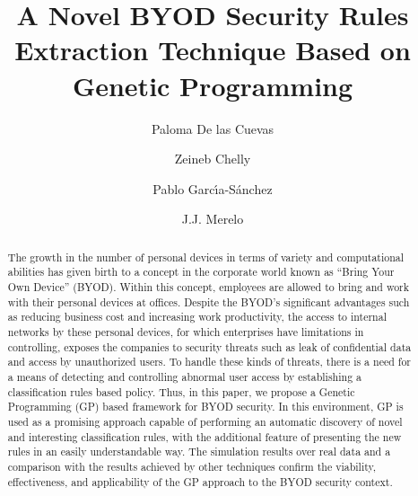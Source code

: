 \documentclass[a4paper,10pt,twocolumn,preprint,3p]{elsarticle}
\begin{document}
\begin{frontmatter}

\title{A Novel BYOD Security Rules Extraction Technique Based on Genetic Programming}

\author[ugr]{Paloma De las Cuevas}
\author[isgt]{Zeineb Chelly}
\author[ugr]{Pablo Garc\'{\i}a-S\'anchez}
\author[ugr]{J.J. Merelo}

\address[ugr]{Department of Computer Architecture and Computer Technology, ETSIIT and CITIC \\
University of Granada, Granada, Spain. Tel: +34958241778. Fax: +34958248993}
\address[isgt]{Laboratoire de Recherche Op\'{e}retionnelle de D\'{e}cision et de Contr\^{o}le de Processus. \\
Institut Sup\'erieur de Gestion de Tunis, Tunisia.}


\begin{abstract}
The growth in the number of personal devices in terms of variety and computational
abilities has given birth to a 
concept in the corporate world
known as ``Bring Your Own Device'' (BYOD).
Within this concept,
employees are allowed to bring and work with their personal devices at
offices. Despite the BYOD's significant advantages such as reducing
business cost and increasing work productivity, the access to internal networks by these personal devices, for which
enterprises have limitations in controlling, exposes the companies to
security threats such as leak of confidential data and access by
unauthorized users. To handle these kinds of threats,
 there
is a need for a means of detecting and controlling abnormal user
access by establishing a classification rules based policy. Thus, in
this paper, we propose a Genetic Programming (GP) based framework for
BYOD security. In this environment, GP is used as a promising approach
capable of performing an automatic discovery of novel and interesting
classification rules, with the additional feature of presenting the new rules in an easily understandable way.
The simulation results over real data and a
comparison with the results achieved by other techniques confirm the
viability, effectiveness, and applicability of the GP approach to the
BYOD security context.
\end{abstract}


\begin{keyword}
\end{keyword}

\end{frontmatter}
\end{document}
